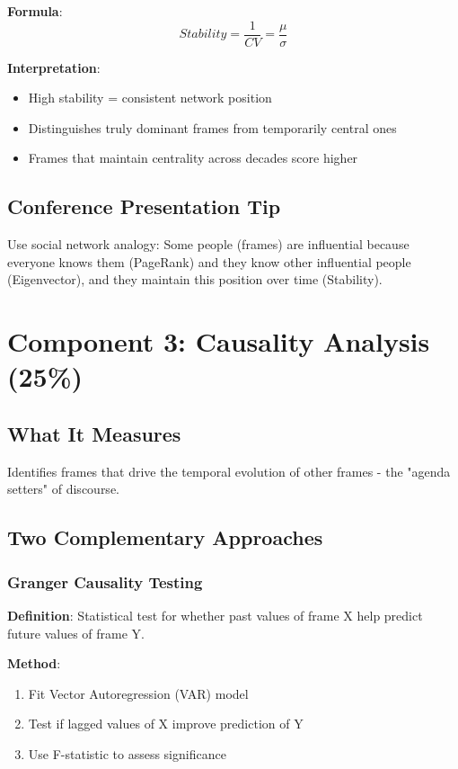 \documentclass[11pt]{article}
\begin{document}
\textbf{Formula}:
$$Stability = \frac{1}{CV} = \frac{\mu}{\sigma}$$

\textbf{Interpretation}:
\begin{itemize}
    \item High stability = consistent network position
    \item Distinguishes truly dominant frames from temporarily central ones
    \item Frames that maintain centrality across decades score higher
\end{itemize}

\subsection{Conference Presentation Tip}
Use social network analogy: Some people (frames) are influential because everyone knows them (PageRank) and they know other influential people (Eigenvector), and they maintain this position over time (Stability).

\section{Component 3: Causality Analysis (25\%)}

\subsection{What It Measures}
Identifies frames that drive the temporal evolution of other frames - the "agenda setters" of discourse.

\subsection{Two Complementary Approaches}

\subsubsection{Granger Causality Testing}
\textbf{Definition}: Statistical test for whether past values of frame X help predict future values of frame Y.

\textbf{Method}:
\begin{enumerate}
    \item Fit Vector Autoregression (VAR) model
    \item Test if lagged values of X improve prediction of Y
    \item Use F-statistic to assess significance
\end{enumerate}
\end{document}

